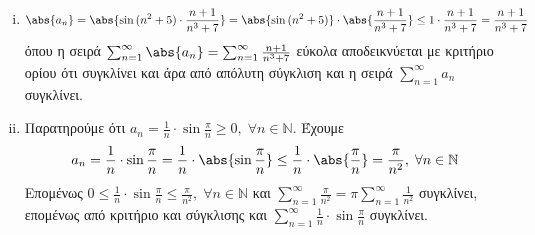 \begin{enumerate}
\begin{enumerate}[i)]
      \item 
        \[
          \abs{a_{n}} = \abs{\sin{(n^{2}+5)} \cdot \frac{n+1}{n^{3}+7}} = 
          \abs{\sin{(n^{2}+5)}} \cdot \abs{\frac{n+1}{n^{3}+7}} \leq 1 \cdot
          \frac{n+1}{n^{3}+7} = \frac{n+1}{n^{3}+7} 
         \] 
        όπου η σειρά $ \sum_{n=1}^{\infty} \abs{a_{n}} = 
        \sum_{n=1}^{\infty} \frac{n+1}{n^{3}+7}  $ εύκολα αποδεικνύεται με 
        κριτήριο ορίου ότι συγκλίνει και άρα από απόλυτη σύγκλιση και η σειρά
        $ \sum_{n=1}^{\infty} a_{n} $ συγκλίνει.

      \item Παρατηρούμε ότι $ a_{n}= \frac{1}{n} \cdot \sin{\frac{\pi}{n}} \geq 0, 
        \; \forall n \in \mathbb{N}$. Έχουμε 
        \[
          a_{n} = \frac{1}{n} \cdot \sin{\frac{\pi}{n}} = \frac{1}{n} 
          \cdot \abs{\sin{\frac{\pi}{n}}} \leq \frac{1}{n} \cdot 
          \abs{\frac{\pi}{n}} = \frac{\pi}{n^{2}}, \; \forall n \in \mathbb{N} 
        \] 
        Επομένως $ 0 \leq \frac{1}{n} \cdot \sin{\frac{\pi}{n}} \leq 
        \frac{\pi}{n^{2}}, \; \forall n \in \mathbb{N}$ και $ \sum_{n=1}^{\infty} 
        \frac{\pi}{n^{2}} = \pi \sum_{n=1}^{\infty} \frac{1}{n^{2}}$ συγκλίνει, 
        επομένως από κριτήριο και σύγκλισης και $ \sum_{n=1}^{\infty} 
        \frac{1}{n} \cdot \sin{\frac{\pi}{n}}$ συγκλίνει.
    \end{enumerate}
\end{enumerate}



